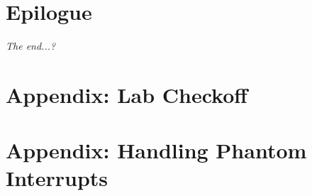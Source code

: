     \section*{Epilogue}                                                 \RangeFinderDetecting

    \textit{The end...?}

    \appendix

    \section{Appendix: Lab Checkoff}                                    

    \section{Appendix: Handling Phantom Interrupts} \label{sec:phantom} 


